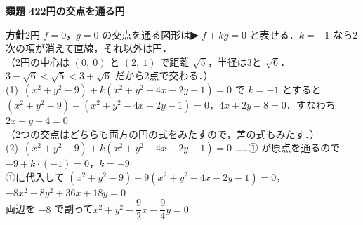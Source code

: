 \documentclass[a4paper,11pt]{ltjsarticle}
\newcommand{\ans}[2]{\Needspace{5\baselineskip}\vspace{6pt}%
  {\sffamily\bfseries 類題 #1\quad #2}\par}
\newcommand{\point}[1]{\textsf{\bfseries ▶ #1}}
\newcommand{\ax}[4]{\draw[->] (#1,0)--(#2,0) node[right]{\scriptsize $x$};
  \draw[->] (0,#3)--(0,#4) node[above]{\scriptsize $y$};
  \node[below left] at (0,0){\scriptsize O};}
\begin{document}
\ans{42}{2円の交点を通る円}
\begin{kai}
\textbf{方針}\quad 2円 $f=0$，$g=0$ の交点を通る図形は\point{$f+kg=0$} と表せる．$k=-1$ なら2次の項が消えて直線，それ以外は円．\\[2pt]
（2円の中心は $(0,\ 0)$ と $(2,\ 1)$ で距離 $\sqrt5$，半径は3と $\sqrt6$．$3-\sqrt6<\sqrt5<3+\sqrt6$ だから2点で交わる．）\\[2pt]
(1)\ $(x^2+y^2-9)+k(x^2+y^2-4x-2y-1)=0$ で $k=-1$ とすると\\
\hspace*{1.5em}$(x^2+y^2-9)-(x^2+y^2-4x-2y-1)=0$，\quad $4x+2y-8=0$．すなわち\quad $2x+y-4=0$\\
\hspace*{1.5em}（2つの交点はどちらも両方の円の式をみたすので，差の式もみたす．）\\[2pt]
(2)\ $(x^2+y^2-9)+k(x^2+y^2-4x-2y-1)=0$ ……① が原点を通るので\\
\hspace*{1.5em}$-9+k\cdot(-1)=0$，\quad $k=-9$\\
\hspace*{1.5em}①に代入して $(x^2+y^2-9)-9(x^2+y^2-4x-2y-1)=0$，\quad $-8x^2-8y^2+36x+18y=0$\\
\hspace*{1.5em}両辺を $-8$ で割って\quad $x^2+y^2-\dfrac92x-\dfrac94y=0$
\begin{center}
\end{center}
\end{kai}
\end{document}

